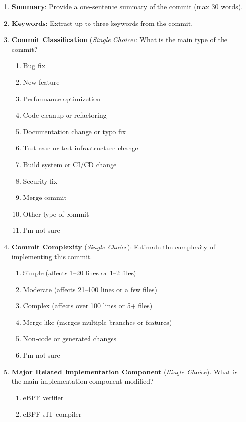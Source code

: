 \documentclass[sigconf,review,anonymous]{acmart}
\begin{document}
\begin{enumerate}
    \item \textbf{Summary}: Provide a one-sentence summary of the commit (max 30 words).
    \item \textbf{Keywords}: Extract up to three keywords from the commit.
    \item \textbf{Commit Classification} (\emph{Single Choice}): What is the main type of the commit?
    \begin{enumerate}[label=(\alph*)]
        \item Bug fix
        \item New feature
        \item Performance optimization
        \item Code cleanup or refactoring
        \item Documentation change or typo fix
        \item Test case or test infrastructure change
        \item Build system or CI/CD change
        \item Security fix
        \item Merge commit
        \item Other type of commit
        \item I'm not sure
    \end{enumerate}
    \item \textbf{Commit Complexity} (\emph{Single Choice}): Estimate the complexity of implementing this commit.
    \begin{enumerate}[label=(\alph*)]
        \item Simple (affects 1--20 lines or 1--2 files)
        \item Moderate (affects 21--100 lines or a few files)
        \item Complex (affects over 100 lines or 5+ files)
        \item Merge-like (merges multiple branches or features)
        \item Non-code or generated changes
        \item I'm not sure
    \end{enumerate}
    \item \textbf{Major Related Implementation Component} (\emph{Single Choice}): What is the main implementation component modified?
    \begin{enumerate}[label=(\alph*)]
        \item eBPF verifier
        \item eBPF JIT compiler

\end{enumerate}
\end{enumerate}
\end{document}
